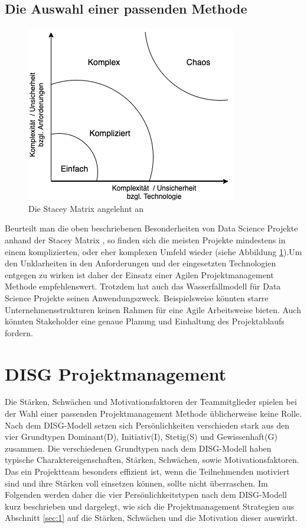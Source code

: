 \documentclass[twocolumn,10pt]{asme2ej}
\begin{document}
\subsection{Die Auswahl einer passenden Methode}

\begin{figure}
	\includegraphics[scale=0.55]{stacey.png}
	\caption[center]{Die Stacey Matrix angelehnt an \cite{stacey_img}}
	\label{fig:stacey}
\end{figure}


Beurteilt man die oben beschriebenen Besonderheiten von Data Science Projekte anhand der Stacey Matrix \cite{Stacey2011StrategicMA}, so finden sich die meisten Projekte mindestens in einem komplizierten, oder eher komplexen Umfeld wieder (siehe Abbildung \ref{fig:stacey}).Um den Unklarheiten in den Anforderungen und der eingesetzten Technologien entgegen zu wirken ist daher der Einsatz einer Agilen Projektmanagement Methode empfehlenswert. Trotzdem hat auch das Wasserfallmodell für Data Science Projekte seinen Anwendungszweck. Beispielsweise könnten starre Unternehmensstrukturen keinen Rahmen für eine Agile Arbeitsweise bieten. Auch könnten Stakeholder eine genaue Planung und Einhaltung des Projektablaufs fordern. 

\section{DISG Projektmanagement}\label{sec:2}
Die Stärken, Schwächen und Motivationsfaktoren der Teammitglieder spielen bei der Wahl einer passenden Projektmanagement Methode üblicherweise keine Rolle. Nach dem  DISG-Modell \cite{disc} setzen sich Persönlichkeiten verschieden stark aus den vier Grundtypen Dominant(D), Initiativ(I), Stetig(S) und Gewissenhaft(G) zusammen. Die verschiedenen Grundtypen nach dem DISG-Modell haben typische Charaktereigenschaften, Stärken, Schwächen, sowie Motivationsfaktoren. Das ein Projektteam besonders effizient ist, wenn die Teilnehmenden motiviert sind und ihre Stärken voll einsetzen können, sollte nicht überraschen. Im Folgenden werden daher die vier Persönlichkeitstypen nach dem DISG-Modell kurz beschrieben und dargelegt, wie sich die Projektmanagement Strategien aus Abschnitt \ref{sec:1} auf die Stärken, Schwächen und die Motivation dieser auswirkt. 
\end{document}
